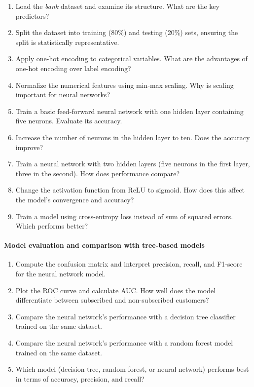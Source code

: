 \documentclass[
  11pt,
]{book}
\providecommand{\tightlist}{%
  \setlength{\itemsep}{0pt}\setlength{\parskip}{0pt}}
\theoremstyle{definition}
\theoremstyle{definition}
\theoremstyle{definition}
\theoremstyle{definition}
\theoremstyle{remark}
\begin{document}
\begin{enumerate}
\def\labelenumi{\arabic{enumi}.}
\setcounter{enumi}{14}
\tightlist
\item
  Load the \emph{bank} dataset and examine its structure. What are the key predictors?
\item
  Split the dataset into training (80\%) and testing (20\%) sets, ensuring the split is statistically representative.
\item
  Apply one-hot encoding to categorical variables. What are the advantages of one-hot encoding over label encoding?
\item
  Normalize the numerical features using min-max scaling. Why is scaling important for neural networks?
\item
  Train a basic feed-forward neural network with one hidden layer containing five neurons. Evaluate its accuracy.
\item
  Increase the number of neurons in the hidden layer to ten. Does the accuracy improve?
\item
  Train a neural network with two hidden layers (five neurons in the first layer, three in the second). How does performance compare?
\item
  Change the activation function from ReLU to sigmoid. How does this affect the model's convergence and accuracy?
\item
  Train a model using cross-entropy loss instead of sum of squared errors. Which performs better?
\end{enumerate}

\paragraph*{Model evaluation and comparison with tree-based models}\label{model-evaluation-and-comparison-with-tree-based-models}

\begin{enumerate}
\def\labelenumi{\arabic{enumi}.}
\setcounter{enumi}{23}
\tightlist
\item
  Compute the confusion matrix and interpret precision, recall, and F1-score for the neural network model.
\item
  Plot the ROC curve and calculate AUC. How well does the model differentiate between subscribed and non-subscribed customers?
\item
  Compare the neural network's performance with a decision tree classifier trained on the same dataset.
\item
  Compare the neural network's performance with a random forest model trained on the same dataset.
\item
  Which model (decision tree, random forest, or neural network) performs best in terms of accuracy, precision, and recall?
\end{enumerate}
\end{document}
